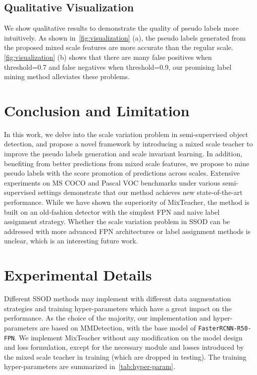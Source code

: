 \documentclass[10pt,twocolumn,letterpaper]{article}
\begin{document}
\subsection{Qualitative Visualization}
We show qualitative results to demonstrate the quality of pseudo labels more intuitively. As shown in~\cref{fig:visualization} (a), the pseudo labels generated from the proposed mixed scale features are more accurate than the regular scale. \cref{fig:visualization} (b) shows that there are many false positives when threshold=0.7 and false negatives when threshold=0.9, our promising label mining method alleviates these problems.

\section{Conclusion and Limitation}
In this work, we delve into the scale variation problem in semi-supervised object detection, and propose a novel framework by
introducing a mixed scale teacher to improve the pseudo labels generation and scale invariant learning. In addition,
benefiting from better predictions from mixed scale features, we propose to mine pseudo labels with the score promotion of predictions across scales.  Extensive experiments on MS COCO and Pascal VOC benchmarks under various semi-supervised settings demonstrate that our method achieves new state-of-the-art performance. While we have shown the superiority of MixTeacher, the method is built on an old-fashion detector with the simplest FPN and naive label assignment strategy. Whether the scale variation problem in SSOD can be addressed with more advanced FPN architectures or label assignment methods is unclear, which is an interesting future work.
\newpage


{\small


}


\clearpage
\vspace{1em}


\renewcommand\thesection{\Roman{section}}
\setcounter{section}{0}
\setcounter{table}{0}
\setcounter{equation}{0}
\setcounter{figure}{0}




\section{Experimental Details}


Different SSOD methods may implement with different data augmentation strategies and training hyper-parameters which have a great impact on the performance. As the choice of the majority, our implementation and hyper-parameters are based on MMDetection, with the base model of \texttt{FasterRCNN-R50-FPN}. We implement MixTeacher without any modification on the model design and loss formulation, except for the necessary module and losses introduced by the mixed scale teacher in training (which are dropped in testing). The training hyper-parameters are summarized in~\cref{tab:hyper-param}.
\end{document}
